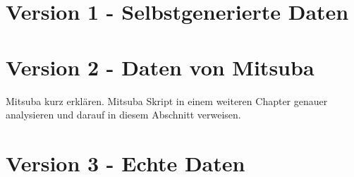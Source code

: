 \section{Version 1 - Selbstgenerierte Daten}


\section{Version 2 - Daten von Mitsuba}

Mitsuba kurz erklären. Mitsuba Skript in einem weiteren Chapter genauer analysieren und darauf in diesem Abschnitt verweisen.

\section{Version 3 - Echte Daten}




